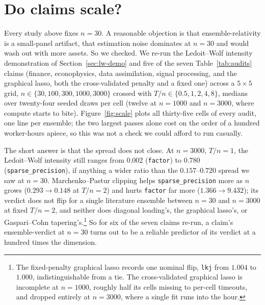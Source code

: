 \documentclass[11pt]{article}
\begin{document}
\section{Do claims scale?}\label{sec:scale}

Every study above fixes $n=30$. A reasonable objection is that
ensemble-relativity is a small-panel artifact, that estimation noise
dominates at $n=30$ and would wash out with more assets. So we checked.
We re-run the Ledoit--Wolf intensity demonstration of Section~\ref{sec:lw-demo} and five of the seven
Table~\ref{tab:audits} claims (finance, econophysics, data assimilation,
signal processing, and the graphical lasso, both the cross-validated
penalty and a fixed one) across a $5\times5$ grid, $n\in\{30, 100, 300,
1000, 3000\}$ crossed with $T/n\in\{0.5,1,2,4,8\}$, medians over
twenty-four seeded draws per cell (twelve at $n=1000$ and $n=3000$,
where compute starts to bite). Figure~\ref{fig:scale} plots all thirty-five cells of every audit, one
line per ensemble; the two largest passes alone cost on the order of a
hundred worker-hours apiece, so this was not a check we could afford to run casually.

The short answer is that the spread does not close. At $n=3000$, $T/n=1$, the Ledoit--Wolf
intensity still ranges from $0.002$ (\texttt{factor}) to $0.780$
(\texttt{sparse\_precision}), if anything a wider ratio than the $0.157$--$0.720$
spread we saw at $n=30$. Marchenko--Pastur clipping helps \texttt{sparse\_precision}
more as $n$ grows ($0.293\to0.148$ at $T/n=2$) and hurts \texttt{factor}
far more ($1.366\to9.432$); its verdict does not flip for a single
literature ensemble between $n=30$ and $n=3000$ at fixed $T/n=2$, and
neither does diagonal loading's, the graphical lasso's, or Gaspari--Cohn
tapering's.\footnote{The fixed-penalty graphical lasso records one
nominal flip, \texttt{lkj} from $1.004$ to $1.000$, indistinguishable
from a tie. The cross-validated graphical lasso is incomplete at
$n=1000$, roughly half its cells missing to per-cell timeouts, and
dropped entirely at $n=3000$, where a single fit runs into the hour.} So
for six of the seven claims re-run, a claim's ensemble-verdict at $n=30$
turns out to be a reliable predictor of its verdict at a hundred times
the dimension.
\end{document}
